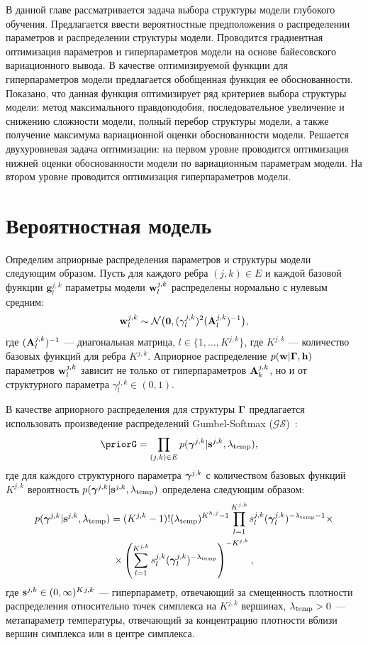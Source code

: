 В данной главе рассматривается задача выбора структуры модели глубокого обучения. Предлагается ввести вероятностные предположения о распределении параметров и распределении структуры модели. 
Проводится градиентная оптимизация параметров и гиперпараметров модели на основе байесовского вариационного вывода.  В качестве оптимизируемой функции для гиперпараметров модели предлагается обобщенная функция ее обоснованности. Показано, что данная функция оптимизирует ряд критериев выбора структуры модели: метод максимального правдоподобия, последовательное увеличение и снижению сложности модели, полный перебор структуры модели, а также получение максимума вариационной оценки обоснованности модели. Решается двухуровневая задача оптимизации: на первом уровне проводится оптимизация нижней оценки обоснованности модели по вариационным параметрам модели. На втором уровне проводится оптимизация гиперпараметров модели.

\section{Вероятностная модель}
Определим априорные распределения параметров и структуры модели следующим образом.
Пусть для каждого ребра $(j,k) \in E$ и каждой базовой функции $\mathbf{g}^{j,k}_l$ параметры модели $\mathbf{w}^{j,k}_l$ распределены нормально с нулевым средним:
\[
    \mathbf{w}^{j,k}_l \sim \mathcal{N}\bigl(\mathbf{0}, (\gamma^{j,k}_l)^2(\mathbf{A}^{j,k}_l)^{-1}\bigr),
\]
где $ (\mathbf{A}^{j,k}_l)^{-1}$ --- диагональная матрица, $l \in \{1,\dots,K^{j,k}\}$, где $K^{j,k}$ --- количество базовых функций для ребра $K^{j,k}$. Априорное распределение $p(\mathbf{w}|\boldsymbol{\Gamma}, \mathbf{h})$ параметров $\mathbf{w}^{j,k}_l$ зависит не только от гиперпараметров $\mathbf{A}_k^{j,k}$, но и от структурного параметра $\gamma^{j,k}_l \in (0,1)$.


В качестве априорного распределения для структуры $\boldsymbol{\Gamma}$ предлагается использовать произведение распределений Gumbel-Softmax ($\mathcal{GS}$)~\cite{gumbel}:
\[
    \priorG = \prod_{(j,k) \in E} p(\g^{j,k}|\s^{j,k}, \lamT), \quad 
\]
где для каждого структурного параметра $\boldsymbol{\gamma}^{j,k}$ с количеством базовых функций $K^{j,k}$ вероятность $p(\boldsymbol{\gamma}^{j,k}|\mathbf{s}^{j,k}, \lambda_{\text{temp}})$ определена следующим образом:
\begin{multline}
\label{eq:gs_pdf}
    p(\boldsymbol{\gamma}^{j,k}|\mathbf{s}^{j,k}, \lambda_{\text{temp}}) = (K^{j,k}-1)!(\lambda_{\text{temp}})^{K^{h,j}-1}\prod_{l=1}^{K^{j,k}} s^{j,k}_l(\boldsymbol{\gamma}^{j,k}_l)^{-\lambda_{\text{temp}} -1} \times \\ \times \left(\sum_{l=1}^{K^{j,k}} s^{j,k}_l(\boldsymbol{\gamma}^{j,k}_l)^{-\lambda_{\text{temp}}}\right)^{-K^{j,k}},
\end{multline}
где $\mathbf{s}^{j,k} \in (0,\infty)^K{^{j,k}}$ --- гиперпараметр, отвечающий за смещенность плотности распределения относительно точек симплекса на $K^{j,k}$ вершинах, $\lambda_{\text{temp}} > 0$ --- метапараметр температуры, отвечающий за концентрацию плотности вблизи вершин симплекса или в центре симплекса.

